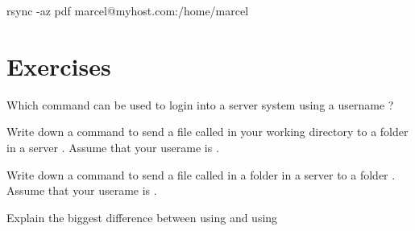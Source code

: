 \begin{command_line}[make]
rsync -az pdf marcel@myhost.com:/home/marcel
\end{command_line}

\section*{Exercises}

\begin{exercises}
  \item Which command can be used to login into a   server system using a username ?
  \item Write down a command to send a file called  in your working directory to a folder  in a server . Assume that your userame is .
  \item Write down a command to send a file called  in a folder  in a server  to a folder . Assume that your userame is .
  \item Explain the biggest difference between using  and using 
 \end{exercises}